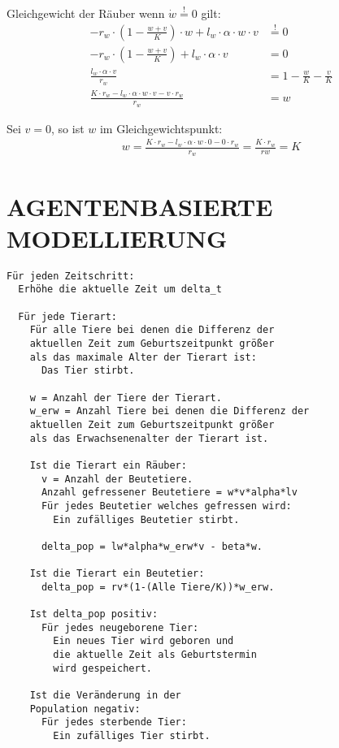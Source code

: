\documentclass[a4paper,twoside]{article}
\begin{document}
	\noindent Gleichgewicht der Räuber wenn \(\dot{w} \stackrel{!}{=} 0\) gilt:
	\begin{align*}
		-r_w \cdot \left(1 - \frac{w+v}{K} \right) \cdot w + l_w \cdot \alpha \cdot w \cdot v &\stackrel{!}{=} 0\\
		-r_w \cdot \left(1 - \frac{w+v}{K} \right) + l_w \cdot \alpha \cdot v &= 0\\
		\frac{l_w \cdot \alpha \cdot v}{r_w} &= 1 - \frac{w}{K}-\frac{v}{K}\\
		\frac{K \cdot r_w - l_w \cdot \alpha \cdot w \cdot v - v \cdot r_w}{r_w} &= w
	\end{align*}
	
	\noindent Sei \(v=0\), so ist \(w\) im Gleichgewichtspunkt:
	\begin{align*}
		w = \frac{K \cdot r_w - l_w \cdot \alpha \cdot w \cdot 0 - 0 \cdot r_w}{r_w} = \frac{K \cdot r_w}{rw} = K
	\end{align*}	
	
	
	
	\newpage
	
	\section{\uppercase{Agentenbasierte Modellierung}}
		
	\begin{small}
	\begin{verbatim}
Für jeden Zeitschritt:
  Erhöhe die aktuelle Zeit um delta_t

  Für jede Tierart:
    Für alle Tiere bei denen die Differenz der
    aktuellen Zeit zum Geburtszeitpunkt größer
    als das maximale Alter der Tierart ist:
      Das Tier stirbt.

    w = Anzahl der Tiere der Tierart.
    w_erw = Anzahl Tiere bei denen die Differenz der
    aktuellen Zeit zum Geburtszeitpunkt größer
    als das Erwachsenenalter der Tierart ist.

    Ist die Tierart ein Räuber:
      v = Anzahl der Beutetiere.
      Anzahl gefressener Beutetiere = w*v*alpha*lv
      Für jedes Beutetier welches gefressen wird:
        Ein zufälliges Beutetier stirbt.
            
      delta_pop = lw*alpha*w_erw*v - beta*w.

    Ist die Tierart ein Beutetier:
      delta_pop = rv*(1-(Alle Tiere/K))*w_erw.

    Ist delta_pop positiv:
      Für jedes neugeborene Tier:
        Ein neues Tier wird geboren und 
        die aktuelle Zeit als Geburtstermin 
        wird gespeichert.

    Ist die Veränderung in der
    Population negativ:
      Für jedes sterbende Tier:
        Ein zufälliges Tier stirbt.	
 		
	\end{verbatim}
	\end{small}
	
\end{document}
